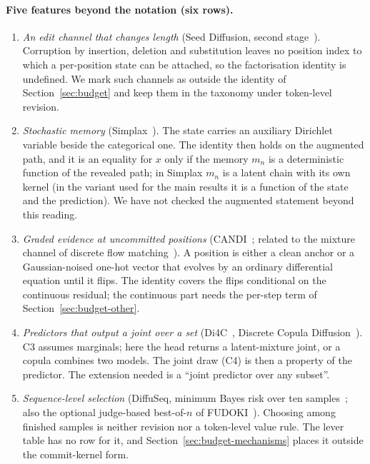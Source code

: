 \paragraph{Five features beyond the notation (six rows).}
\begin{enumerate}
  \item \emph{An edit channel that changes length} (Seed Diffusion, second stage~\cite{arXiv:2508.02193}). Corruption by insertion, deletion and substitution leaves no position index to which a per-position state can be attached, so the factorisation identity is undefined. We mark such channels as outside the identity of Section~\ref{sec:budget} and keep them in the taxonomy under token-level revision. %
  \item \emph{Stochastic memory} (Simplax~\cite{arXiv:2608.10615}). The state carries an auxiliary Dirichlet variable beside the categorical one. The identity then holds on the augmented path, and it is an equality for $x$ only if the memory $m_n$ is a deterministic function of the revealed path; in Simplax $m_n$ is a latent chain with its own kernel (in the variant used for the main results it is a function of the state and the prediction). We have not checked the augmented statement beyond this reading. %
  \item \emph{Graded evidence at uncommitted positions} (CANDI~\cite{arXiv:2510.22510}; related to the mixture channel of discrete flow matching~\cite{arXiv:2407.15595}). A position is either a clean anchor or a Gaussian-noised one-hot vector that evolves by an ordinary differential equation until it flips. The identity covers the flips conditional on the continuous residual; the continuous part needs the per-step term of Section~\ref{sec:budget-other}. %
  \item \emph{Predictors that output a joint over a set} (Di4C~\cite{arXiv:2410.08709}, Discrete Copula Diffusion~\cite{arXiv:2410.01949}). C3 assumes marginals; here the head returns a latent-mixture joint, or a copula combines two models. The joint draw (C4) is then a property of the predictor. The extension needed is a ``joint predictor over any subset''. %
  \item \emph{Sequence-level selection} (DiffuSeq, minimum Bayes risk over ten samples~\cite{arXiv:2210.08933}; also the optional judge-based best-of-$n$ of FUDOKI~\cite{arXiv:2505.20147}). Choosing among finished samples is neither revision nor a token-level value rule. The lever table has no row for it, and Section~\ref{sec:budget-mechanisms} places it outside the commit-kernel form. %
\end{enumerate}

